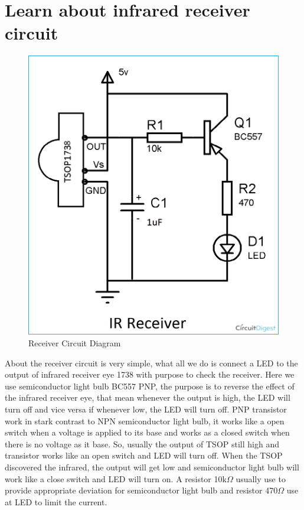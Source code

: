 \documentclass[a4paper]{report}
\begin{document}
    \section{Learn about infrared receiver circuit}
        \begin{figure}[h]
            \centering
            \includegraphics[width=\linewidth]{receiver.png}
            \caption{\label{fig:boat}Receiver Circuit Diagram}
        \end{figure}
        About the receiver circuit is very simple, what all we do is connect a LED to the output of 
        infrared receiver eye 1738 with purpose to check the receiver. Here we use semiconductor light bulb 
        BC557 PNP, the purpose is to reverse the effect of the infrared receiver eye, that mean whenever 
        the output is high, the LED will turn off and vice versa if whenever low, the LED will turn off. 
        PNP transistor work in stark contrast to NPN semiconductor light bulb, it works like a open switch when 
        a voltage is applied to its base and works as a closed switch when there is no voltage as it base. So, 
        usually the output of TSOP still high and transistor works like an open switch and LED will turn off. 
        When the TSOP discovered the infrared, the output will get low and semiconductor light bulb will work 
        like a close switch and LED will turn on. A resistor 10k$\Omega$ usually use to provide appropriate 
        deviation for semiconductor light bulb and resistor 470$\Omega$ use at LED to limit the current.
\end{document}
